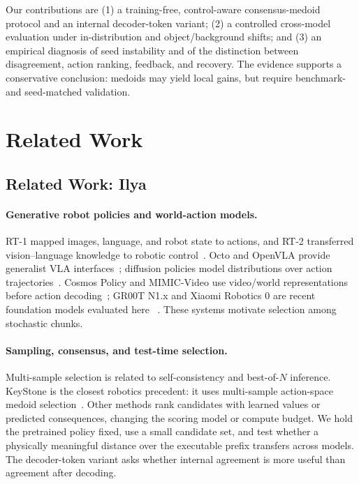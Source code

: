 \documentclass{article}
\begin{document}
Our contributions are (1) a training-free, control-aware consensus-medoid
protocol and an internal decoder-token variant; (2) a controlled cross-model
evaluation under in-distribution and object/background shifts; and (3) an
empirical diagnosis of seed instability and of the distinction between
disagreement, action ranking, feedback, and recovery. The evidence supports a
conservative conclusion: medoids may yield local gains, but require
benchmark- and seed-matched validation.


\section{Related Work}
\subsection{Related Work: Ilya}

\paragraph{Generative robot policies and world-action models.}
RT-1 mapped images, language, and robot state to actions, and RT-2 transferred
vision--language knowledge to robotic control~\cite{rt1,rt2}. Octo and OpenVLA
provide generalist VLA interfaces~\cite{octo,openvla}; diffusion policies model
distributions over action trajectories~\cite{diffusionpolicy}. Cosmos Policy and
MIMIC-Video use video/world representations before action decoding~\cite{cosmos,mimicvideo};
GR00T N1.x and Xiaomi Robotics 0 are recent foundation models evaluated here
~\cite{groot,xiaomi}. These systems motivate selection among stochastic chunks.

\paragraph{Sampling, consensus, and test-time selection.}
Multi-sample selection is related to self-consistency and best-of-$N$ inference.
KeyStone is the closest robotics precedent: it uses multi-sample action-space
medoid selection~\cite{keystone}. Other methods rank candidates with learned
values or predicted consequences, changing the scoring model or compute budget.
We hold the pretrained policy fixed, use a small candidate set, and test whether
a physically meaningful distance over the executable prefix transfers across
models. The decoder-token variant asks whether internal agreement is more useful
than agreement after decoding.
\end{document}
